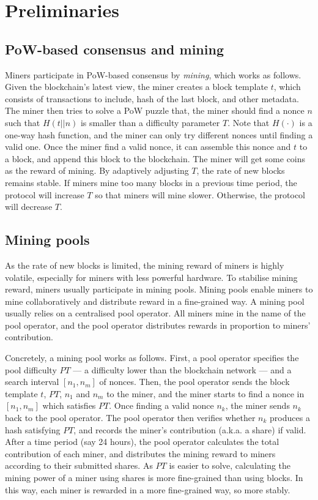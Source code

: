 \section{Preliminaries}
\label{sec:preliminaries}

\subsection{PoW-based consensus and mining}
Miners participate in PoW-based consensus by \emph{mining}, which works as follows.
Given the blockchain's latest view, the miner creates a block template $t$, which consists of transactions to include, hash of the last block, and other metadata.
The miner then tries to solve a PoW puzzle that, the miner should find a nonce $n$ such that $H(t || n)$ is smaller than a difficulty parameter $T$.
Note that $H(\cdot)$ is a one-way hash function, and the miner can only try different nonces until finding a valid one.
Once the miner find a valid nonce, it can assemble this nonce and $t$ to a block, and append this block to the blockchain.
The miner will get some coins as the reward of mining.
By adaptively adjusting $T$, the rate of new blocks remains stable.
If miners mine too many blocks in a previous time period, the protocol will increase $T$ so that miners will mine slower.
Otherwise, the protocol will decrease $T$.

\subsection{Mining pools}
As the rate of new blocks is limited, the mining reward of miners is highly volatile, especially for miners with less powerful hardware.
To stabilise mining reward, miners usually participate in mining pools.
Mining pools enable miners to mine collaboratively and distribute reward in a fine-grained way.
A mining pool usually relies on a centralised pool operator.
All miners mine in the name of the pool operator, and the pool operator distributes rewards in proportion to miners' contribution.

Concretely, a mining pool works as follows.
First, a pool operator specifies the pool difficulty $PT$ --- a difficulty lower than the blockchain network --- and a search interval $[n_1, n_m]$ of nonces.
Then, the pool operator sends the block template $t$, $PT$, $n_1$ and $n_m$ to the miner, and the miner starts to find a nonce in $[n_1, n_m]$ which satisfies $PT$.
Once finding a valid nonce $n_k$, the miner sends $n_k$ back to the pool operator.
The pool operator then verifies whether $n_k$ produces a hash satisfying $PT$, and records the miner's contribution (a.k.a. a share) if valid.
After a time period (say 24 hours), the pool operator calculates the total contribution of each miner, and distributes the mining reward to miners according to their submitted shares.
As $PT$ is easier to solve, calculating the mining power of a miner using shares is more fine-grained than using blocks.
In this way, each miner is rewarded in a more fine-grained way, so more stably.


